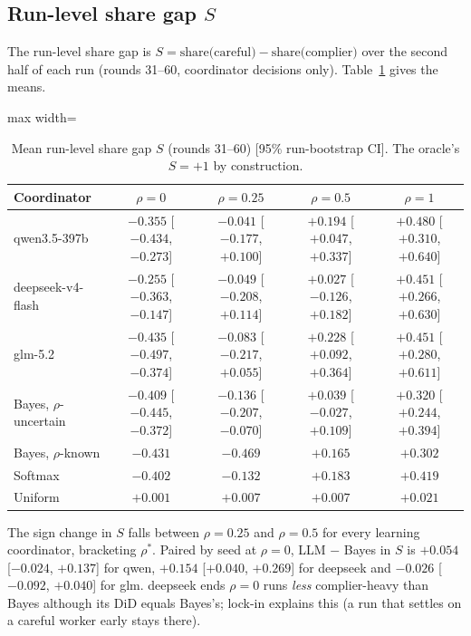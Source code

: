 \documentclass[11pt,letterpaper]{article}
\newcommand{\rhostar}{\rho^{*}}
\newcommand{\did}{\mathrm{DiD}}
\numberwithin{equation}{section}
\numberwithin{table}{section}
\numberwithin{figure}{section}
\numberwithin{algorithm}{section}
\begin{document}
\subsection{Run-level share gap $S$}

The run-level share gap is $S=\text{share(careful)}-\text{share(complier)}$ over the second half of each run (rounds 31--60, coordinator decisions only). Table~\ref{tab:S} gives the means.

\begin{table}[h]
\centering\small
\caption{Mean run-level share gap $S$ (rounds 31--60) [95\% run-bootstrap CI]. The oracle's $S=+1$ by construction.}
\label{tab:S}
\begin{adjustbox}{max width=\linewidth}
\begin{tabular}{lcccc}
\toprule
Coordinator & $\rho=0$ & $\rho=0.25$ & $\rho=0.5$ & $\rho=1$ \\
\midrule
qwen3.5-397b & $-0.355$ [$-0.434$, $-0.273$] & $-0.041$ [$-0.177$, $+0.100$] & $+0.194$ [$+0.047$, $+0.337$] & $+0.480$ [$+0.310$, $+0.640$] \\
deepseek-v4-flash & $-0.255$ [$-0.363$, $-0.147$] & $-0.049$ [$-0.208$, $+0.114$] & $+0.027$ [$-0.126$, $+0.182$] & $+0.451$ [$+0.266$, $+0.630$] \\
glm-5.2 & $-0.435$ [$-0.497$, $-0.374$] & $-0.083$ [$-0.217$, $+0.055$] & $+0.228$ [$+0.092$, $+0.364$] & $+0.451$ [$+0.280$, $+0.611$] \\
\addlinespace
Bayes, $\rho$-uncertain & $-0.409$ [$-0.445$, $-0.372$] & $-0.136$ [$-0.207$, $-0.070$] & $+0.039$ [$-0.027$, $+0.109$] & $+0.320$ [$+0.244$, $+0.394$] \\
Bayes, $\rho$-known & $-0.431$ & $-0.469$ & $+0.165$ & $+0.302$ \\
Softmax & $-0.402$ & $-0.132$ & $+0.183$ & $+0.419$ \\
Uniform & $+0.001$ & $+0.007$ & $+0.007$ & $+0.021$ \\
\bottomrule
\end{tabular}
\end{adjustbox}
\end{table}

\noindent The sign change in $S$ falls between $\rho=0.25$ and $\rho=0.5$ for every learning coordinator, bracketing $\rhostar$. Paired by seed at $\rho=0$, LLM $-$ Bayes in $S$ is $+0.054$ [$-0.024$, $+0.137$] for qwen, $+0.154$ [$+0.040$, $+0.269$] for deepseek and $-0.026$ [$-0.092$, $+0.040$] for glm. deepseek ends $\rho=0$ runs \emph{less} complier-heavy than Bayes although its $\did$ equals Bayes's; lock-in explains this (a run that settles on a careful worker early stays there).
\end{document}
